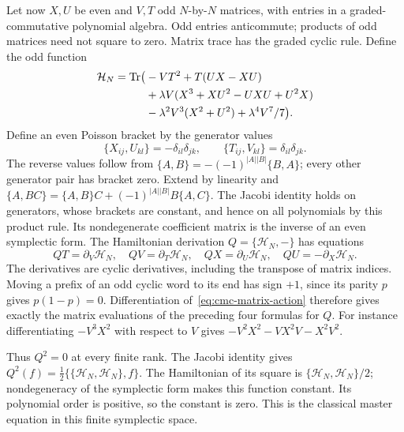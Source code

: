Let now \(X,U\) be even and \(V,T\) odd \(N\)-by-\(N\)
matrices, with entries in a graded-commutative polynomial
algebra. Odd entries anticommute; products of odd matrices
need not square to zero. Matrix trace has the graded cyclic
rule. Define the odd function
\begin{align}
 \mathcal H_N=\operatorname{Tr}\bigl(
 &-VT^2+T(UX-XU)\notag\\
 &+\lambda V(X^3+XU^2-UXU+U^2X)\notag\\
 &-\lambda^2V^3(X^2+U^2)+\lambda^4V^7/7\bigr).
 \label{eq:cmc-matrix-action}
\end{align}
Define an even Poisson bracket by the generator values
\[
 \{X_{ij},U_{kl}\}=-\delta_{il}\delta_{jk},\qquad
 \{T_{ij},V_{kl}\}=\delta_{il}\delta_{jk}.
\]
The reverse values follow from
\(\{A,B\}=-(-1)^{|A||B|}\{B,A\}\); every other generator
pair has bracket zero. Extend by linearity and
\(\{A,BC\}=\{A,B\}C+(-1)^{|A||B|}B\{A,C\}\).
The Jacobi identity holds on generators, whose brackets are
constant, and hence on all polynomials by this product rule.
Its nondegenerate coefficient matrix is the inverse of an even
symplectic form. The Hamiltonian derivation
\(Q=\{\mathcal H_N,-\}\) has equations
\[
 QT=\partial_V\mathcal H_N,\quad
 QV=\partial_T\mathcal H_N,\quad
 QX=\partial_U\mathcal H_N,\quad
 QU=-\partial_X\mathcal H_N.
\]
The derivatives are cyclic derivatives, including the transpose
of matrix indices. Moving a prefix of an odd cyclic word to
its end has sign \(+1\), since its parity \(p\) gives
\(p(1-p)=0\). Differentiation of~\eqref{eq:cmc-matrix-action}
therefore gives exactly the matrix evaluations of the preceding
four formulas for \(Q\). For instance differentiating
\(-V^3X^2\) with respect to \(V\) gives
\(-V^2X^2-VX^2V-X^2V^2\).

Thus \(Q^2=0\) at every finite rank. The Jacobi identity gives
\(Q^2(f)=\tfrac12\{\{\mathcal H_N,\mathcal H_N\},f\}\).
The Hamiltonian of its
square is \(\{\mathcal H_N,\mathcal H_N\}/2\); nondegeneracy
of the symplectic form makes this function constant. Its
polynomial order is positive, so the constant is zero.
This is the classical master equation in this finite
symplectic space.

